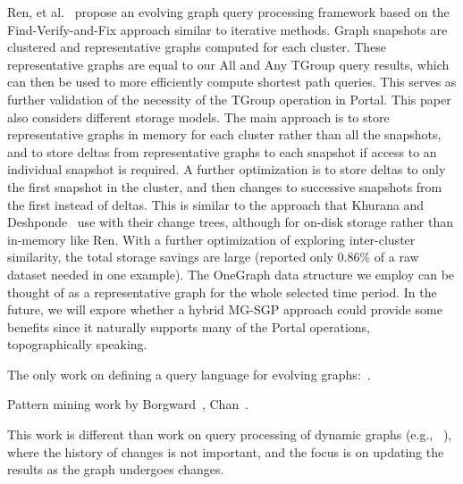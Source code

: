 Ren, et al.~\cite{Ren2011} propose an evolving graph query processing
framework based on the Find-Verify-and-Fix approach similar to
iterative methods.  Graph snapshots are clustered and representative
graphs computed for each cluster.  These representative graphs are
equal to our All and Any TGroup query results, which can then be used
to more efficiently compute shortest path queries.  This serves as
further validation of the necessity of the TGroup operation in Portal.
This paper also considers different storage models.  The main approach
is to store representative graphs in memory for each cluster rather
than all the snapshots, and to store deltas from representative graphs
to each snapshot if access to an individual snapshot is required.  A
further optimization is to store deltas to only the first snapshot in
the cluster, and then changes to successive snapshots from the first
instead of deltas.  This is similar to the approach that Khurana and
Deshponde~\cite{Khurana2013} use with their change trees, although for
on-disk storage rather than in-memory like Ren.  With a further
optimization of exploring inter-cluster similarity, the total storage
savings are large (reported only 0.86\% of a raw dataset needed in one
example).  The OneGraph data structure we employ can be thought of as
a representative graph for the whole selected time period.  In the
future, we will expore whether a hybrid MG-SGP approach could provide
some benefits since it naturally supports many of the Portal
operations, topographically speaking.

The only work on defining a query
language for evolving graphs:~\cite{Kan2009}.

Pattern mining work by Borgward~\cite{Borgwardt2006}, Chan~\cite{Chan2008}.

This work is different than work on query processing of dynamic graphs
(e.g., ~\cite{Mondal2012}), where the history of changes is not
important, and the focus is on updating the results as the graph
undergoes changes.
